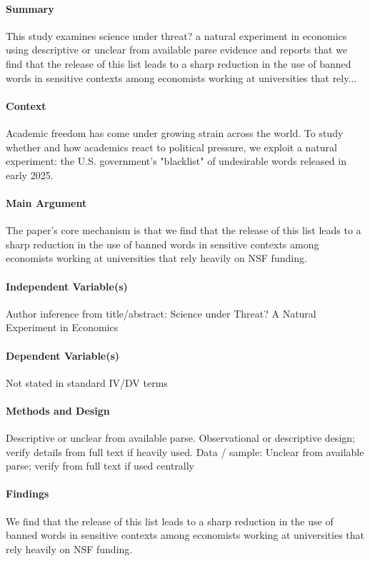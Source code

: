 \documentclass[12pt]{article}
\begin{document}
\paragraph{Summary} This study examines science under threat? a natural experiment in economics using descriptive or unclear from available parse evidence and reports that we find that the release of this list leads to a sharp reduction in the use of banned words in sensitive contexts among economists working at universities that rely...

\paragraph{Context} Academic freedom has come under growing strain across the world. To study whether and how academics react to political pressure, we exploit a natural experiment: the U.S. government's "blacklist" of undesirable words released in early 2025.

\paragraph{Main Argument} The paper's core mechanism is that we find that the release of this list leads to a sharp reduction in the use of banned words in sensitive contexts among economists working at universities that rely heavily on NSF funding.

\paragraph{Independent Variable(s)} Author inference from title/abstract: Science under Threat? A Natural Experiment in Economics

\paragraph{Dependent Variable(s)} Not stated in standard IV/DV terms

\paragraph{Methods and Design} Descriptive or unclear from available parse. Observational or descriptive design; verify details from full text if heavily used. Data / sample: Unclear from available parse; verify from full text if used centrally

\paragraph{Findings} We find that the release of this list leads to a sharp reduction in the use of banned words in sensitive contexts among economists working at universities that rely heavily on NSF funding.
\end{document}
